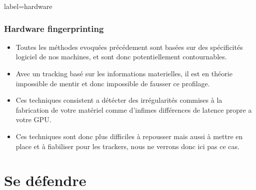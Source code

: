 \documentclass{beamer}
\begin{document}
        \begin{frame}{label=hardware}
          \frametitle{Hardware fingerprinting}
            \begin{center}
                \begin{itemize}
                    \item Toutes les méthodes evoquées précédement sont basées sur des spécificités logiciel de nos machines, et sont donc potentiellement contournables.
                    \item Avec un tracking basé sur les informations materielles, il est en théorie impossible de mentir et donc impossible de fausser ce profilage.
                    \item Ces techniques consistent a détécter des irrégularités commises à la fabrication de votre matériel comme d'infimes différences de latence propre a votre GPU.
                    \item Ces techniques sont donc plus difficiles à repousser mais aussi à mettre en place et à fiabiliser pour les trackers, nous ne verrons donc ici pas ce cas.
                \end{itemize}
            \end{center}
        \end{frame}
        \section{Se défendre}
\end{document}

